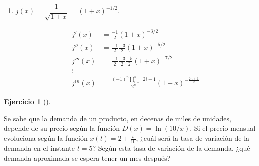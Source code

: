 \documentclass[
  spanish,
  a4paper,
]{scrreport}
\theoremstyle{definition}
\newtheorem{exercise}{Ejercicio}[chapter]
\theoremstyle{remark}
\begin{document}
\begin{tcolorbox}
\begin{enumerate}
  Calculamos ahora las sucesivas derivadas.

  \begin{align*}
   h'(x) & = 5(-1)(x-3)^{-2}+3(-1)(x-1)^{-2}+(-1)(x+2)^{-2}\\ 
   h''(x) &= 5(-1)(-2)(x-3)^{-3}+3(-1)(-2)(x-1)^{-3}+(-1)(-2)(x+2)^{-3}\\
   h'''(x) &= 5(-1)(-2)(-3)(x-3)^{-4}+3(-1)(-2)(-3)(x-1)^{-4}+(-1)(-2)(-3)(x+2)^{-4}\\
   \vdots \\ 
   h^{(n}(x) &= 5(-1)^n n!(x-3)^{-(n+1)}+ 3(-1)^n n!(x-1)^{-(n+1)} + (-1)^n n!(x+2)^{-(n+1)}
   \end{align*}
\item
  \(j(x)=\dfrac{1}{\sqrt{1+x}}=(1+x)^{-1/2}\).

  \begin{align*}
   j'(x) &= \frac{-1}{2}(1+x)^{-3/2}\\ 
   j''(x) &= \frac{-1}{2}\frac{-3}{2}(1+x)^{-5/2}\\ 
   j'''(x) &= \frac{-1}{2}\frac{-3}{2}\frac{-5}{2}(1+x)^{-7/2}\\ 
   \vdots \\ 
   j^{(n}(x) &= \frac{(-1)^n \prod_{i=1}^{n}2i-1}{2^n}(1+x)^{-\frac{2n+1}{2}}
   \end{align*}
\end{enumerate}

\end{tcolorbox}

\begin{exercise}[]\protect\hypertarget{exr-regla-cadena-1}{}\label{exr-regla-cadena-1}

Se sabe que la demanda de un producto, en decenas de miles de unidades,
depende de su precio según la función \(D(x)=\ln(10/x)\). Si el precio
mensual evoluciona según la función \(x(t)=2+\frac{t}{10}\), ¿cuál será
la tasa de variación de la demanda en el instante \(t=5\)? Según esta
tasa de variación de la demanda, ¿qué demanda aproximada se espera tener
un mes después?

\end{exercise}
\end{document}
